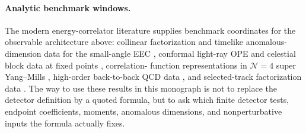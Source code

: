 \paragraph{Analytic benchmark windows.}
The modern energy-correlator literature supplies benchmark coordinates for
the observable architecture above: collinear factorization and timelike
anomalous-dimension data for the small-angle EEC
\cite{DixonMoultZhu2019CollinearEEC}, conformal light-ray OPE and celestial
block data at fixed points
\cite{KologluKravchukSimmonsDuffinZhiboedov2019LightRayOPE}, correlation-
function representations in \(\mathcal N=4\) super Yang--Mills
\cite{BelitskyHoheneggerKorchemskySokatchevZhiboedov2013EventShapesN4,
BelitskyHoheneggerKorchemskySokatchevZhiboedov2013EECN4,
HennSokatchevYanZhiboedov2019EECNNLO}, high-order back-to-back QCD data
\cite{EbertMistlbergerVita2020EECBackToBackN3LO}, and selected-track
factorization data
\cite{JaarsmaLiMoultWaalewijnZhu2023TrackEEC}.  The way to use these results
in this monograph is not to replace the detector definition by a quoted
formula, but to ask which finite detector tests, endpoint coefficients,
moments, anomalous dimensions, and nonperturbative inputs the formula
actually fixes.

